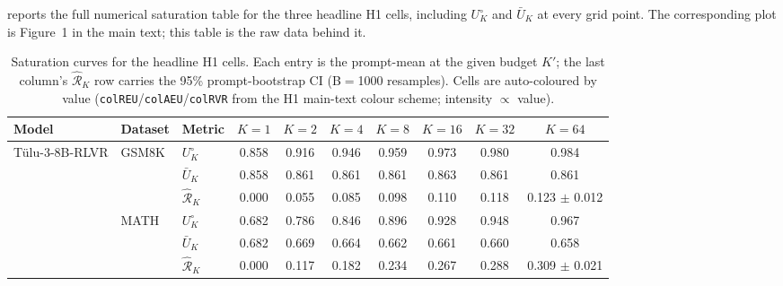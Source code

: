  reports the full numerical saturation table
for the three headline H1 cells, including $U^\circ_K$ and $\bar U_K$ at
every grid point. The corresponding plot is Figure~1 in the main text;
this table is the raw data behind it.

\begin{table}[t]
\centering
\small
\setlength{\tabcolsep}{4pt}
\caption{Saturation curves for the headline H1 cells. Each entry is the prompt-mean at the given budget $K'$; the last column's $\hat{\mathcal R}_K$ row carries the 95\% prompt-bootstrap CI (B$=$1000 resamples). Cells are auto-coloured by value (\texttt{colREU}/\texttt{colAEU}/\texttt{colRVR} from the H1 main-text colour scheme; intensity $\propto$ value).}
\label{tab:appendix_saturation}
\begin{tabular}{lll *{7}{c}}
\toprule
Model & Dataset & Metric & $K{=}1$ & $K{=}2$ & $K{=}4$ & $K{=}8$ & $K{=}16$ & $K{=}32$ & $K{=}64$ \\
\midrule
\multirow{9}{*}{Tülu-3-8B-RLVR} & \multirow{3}{*}{GSM8K} & $U^\circ_K$ & \cellcolor{colREU!51}0.858 & \cellcolor{colREU!55}0.916 & \cellcolor{colREU!57}0.946 & \cellcolor{colREU!58}0.959 & \cellcolor{colREU!58}0.973 & \cellcolor{colREU!59}0.980 & \cellcolor{colREU!59}0.984 \\
 &  & $\bar U_K$ & \cellcolor{colAEU!51}0.858 & \cellcolor{colAEU!52}0.861 & \cellcolor{colAEU!52}0.861 & \cellcolor{colAEU!52}0.861 & \cellcolor{colAEU!52}0.863 & \cellcolor{colAEU!52}0.861 & \cellcolor{colAEU!52}0.861 \\
 &  & $\hat{\mathcal R}_K$ & \cellcolor{colRVR!0}0.000 & \cellcolor{colRVR!3}0.055 & \cellcolor{colRVR!5}0.085 & \cellcolor{colRVR!6}0.098 & \cellcolor{colRVR!7}0.110 & \cellcolor{colRVR!7}0.118 & \cellcolor{colRVR!7}0.123 $\pm$ 0.012 \\
\cmidrule(l){2-10}
 & \multirow{3}{*}{MATH} & $U^\circ_K$ & \cellcolor{colREU!41}0.682 & \cellcolor{colREU!47}0.786 & \cellcolor{colREU!51}0.846 & \cellcolor{colREU!54}0.896 & \cellcolor{colREU!56}0.928 & \cellcolor{colREU!57}0.948 & \cellcolor{colREU!58}0.967 \\
 &  & $\bar U_K$ & \cellcolor{colAEU!41}0.682 & \cellcolor{colAEU!40}0.669 & \cellcolor{colAEU!40}0.664 & \cellcolor{colAEU!40}0.662 & \cellcolor{colAEU!40}0.661 & \cellcolor{colAEU!40}0.660 & \cellcolor{colAEU!39}0.658 \\
 &  & $\hat{\mathcal R}_K$ & \cellcolor{colRVR!0}0.000 & \cellcolor{colRVR!7}0.117 & \cellcolor{colRVR!11}0.182 & \cellcolor{colRVR!14}0.234 & \cellcolor{colRVR!16}0.267 & \cellcolor{colRVR!17}0.288 & \cellcolor{colRVR!19}0.309 $\pm$ 0.021 \\

\end{tabular}
\end{table}

